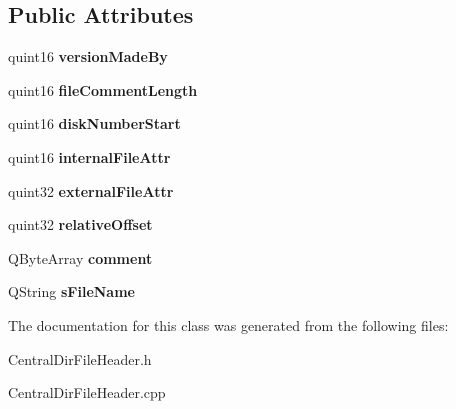 \subsection*{Public Attributes}
\begin{DoxyCompactItemize}
\item 
quint16 {\bfseries version\+Made\+By}\hypertarget{class_central_dir_file_header_a77151181bd4959798b24e3eabcffc175}{}\label{class_central_dir_file_header_a77151181bd4959798b24e3eabcffc175}

\item 
quint16 {\bfseries file\+Comment\+Length}\hypertarget{class_central_dir_file_header_afd3e9292575de99acf41c217bf7c2ab6}{}\label{class_central_dir_file_header_afd3e9292575de99acf41c217bf7c2ab6}

\item 
quint16 {\bfseries disk\+Number\+Start}\hypertarget{class_central_dir_file_header_aa9e6ee7f961258189c65b2bab9f5372a}{}\label{class_central_dir_file_header_aa9e6ee7f961258189c65b2bab9f5372a}

\item 
quint16 {\bfseries internal\+File\+Attr}\hypertarget{class_central_dir_file_header_ab638cf854455dfcf5ed68ef537beb7bf}{}\label{class_central_dir_file_header_ab638cf854455dfcf5ed68ef537beb7bf}

\item 
quint32 {\bfseries external\+File\+Attr}\hypertarget{class_central_dir_file_header_aa2808c73e4aa65d594fd0894d801a235}{}\label{class_central_dir_file_header_aa2808c73e4aa65d594fd0894d801a235}

\item 
quint32 {\bfseries relative\+Offset}\hypertarget{class_central_dir_file_header_a2c7d9e91e348f35315d85f5de7b79abf}{}\label{class_central_dir_file_header_a2c7d9e91e348f35315d85f5de7b79abf}

\item 
Q\+Byte\+Array {\bfseries comment}\hypertarget{class_central_dir_file_header_a3bd3d7a3e379fcc96812329d74537f09}{}\label{class_central_dir_file_header_a3bd3d7a3e379fcc96812329d74537f09}

\item 
Q\+String {\bfseries s\+File\+Name}\hypertarget{class_central_dir_file_header_a79ae94905014b0e2d4d644d8d98eb807}{}\label{class_central_dir_file_header_a79ae94905014b0e2d4d644d8d98eb807}

\end{DoxyCompactItemize}


The documentation for this class was generated from the following files\+:\begin{DoxyCompactItemize}
\item 
Central\+Dir\+File\+Header.\+h\item 
Central\+Dir\+File\+Header.\+cpp\end{DoxyCompactItemize}
